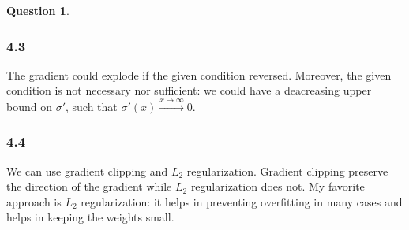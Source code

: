 \documentclass[12pt]{article}
\theoremstyle{definition}
\newtheorem{exercise}{Question}%
\begin{document}
\begin{exercise}
{    \subsubsection*{4.3}
    The gradient could explode if the given condition reversed.  Moreover, the
    given condition is not necessary nor sufficient: we could have a deacreasing
    upper bound on $\sigma'$, such that $\sigma'(x) \xrightarrow{x \to \infty} 0$.
    \subsubsection*{4.4}
    We can use gradient clipping and $L_{2}$ regularization. Gradient clipping
    preserve the direction of the gradient while $L_{2}$ regularization does not. My
    favorite approach is $L_{2}$ regularization: it helps in preventing
    overfitting in many cases and helps in keeping the weights small.
    }
\end{exercise}
\end{document}
